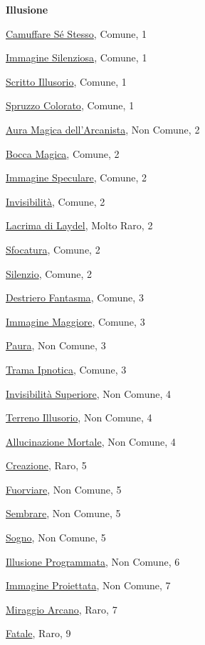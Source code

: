 \begin{multicols}{3}
{{\medskip\textbf{Illusione}

\hyperlink{Camuffare Sé Stesso}{Camuffare Sé Stesso}, Comune, 1

\hyperlink{Immagine Silenziosa}{Immagine Silenziosa}, Comune, 1

\hyperlink{Scritto Illusorio}{Scritto Illusorio}, Comune, 1

\hyperlink{Spruzzo Colorato}{Spruzzo Colorato}, Comune, 1

\hyperlink{Aura Magica dell'Arcanista}{Aura Magica dell'Arcanista}, Non Comune, 2

\hyperlink{Bocca Magica}{Bocca Magica}, Comune, 2

\hyperlink{Immagine Speculare}{Immagine Speculare}, Comune, 2

\hyperlink{Invisibilità}{Invisibilità}, Comune, 2

\hyperlink{Lacrima di Laydel}{Lacrima di Laydel}, Molto Raro, 2

\hyperlink{Sfocatura}{Sfocatura}, Comune, 2

\hyperlink{Silenzio}{Silenzio}, Comune, 2

\hyperlink{Destriero Fantasma}{Destriero Fantasma}, Comune, 3

\hyperlink{Immagine Maggiore}{Immagine Maggiore}, Comune, 3

\hyperlink{Paura}{Paura}, Non Comune, 3

\hyperlink{Trama Ipnotica}{Trama Ipnotica}, Comune, 3

\hyperlink{Invisibilità Superiore}{Invisibilità Superiore}, Non Comune, 4

\hyperlink{Terreno Illusorio}{Terreno Illusorio}, Non Comune, 4

\hyperlink{Allucinazione Mortale}{Allucinazione Mortale}, Non Comune, 4

\hyperlink{Creazione}{Creazione}, Raro, 5

\hyperlink{Fuorviare}{Fuorviare}, Non Comune, 5

\hyperlink{Sembrare}{Sembrare}, Non Comune, 5

\hyperlink{Sogno}{Sogno}, Non Comune, 5

\hyperlink{Illusione Programmata}{Illusione Programmata}, Non Comune, 6

\hyperlink{Immagine Proiettata}{Immagine Proiettata}, Non Comune, 7

\hyperlink{Miraggio Arcano}{Miraggio Arcano}, Raro, 7

\hyperlink{Fatale}{Fatale}, Raro, 9

}}
\end{multicols}
